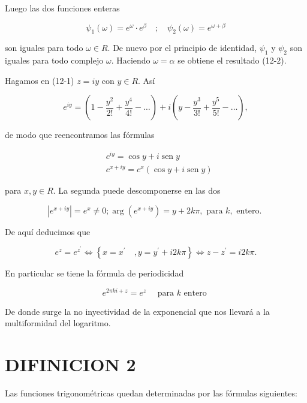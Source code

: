 \documentclass[10pt]{article}
\theoremstyle{plain}
\theoremstyle{definition}
\theoremstyle{remark}
\begin{document}
Luego las dos funciones enteras

$$
\psi_{1}(\omega)=e^{\omega} \cdot e^{\beta} \quad ; \quad \psi_{2}(\omega)=e^{\omega+\beta}
$$

son iguales para todo $\omega \in R$. De nuevo por el principio de identidad, $\psi_{1}$ y $\psi_{2}$ son iguales para todo complejo $\omega$. Haciendo $\omega=\alpha$ se obtiene el resultado (12-2).

Hagamos en (12-1) $z=i y$ con $y \in R$. Así

$$
e^{i y}=\left(1-\frac{y^{2}}{2!}+\frac{y^{4}}{4!}-\ldots\right)+i\left(y-\frac{y^{3}}{3!}+\frac{y^{5}}{5!}-\ldots\right),
$$

de modo que reencontramos las fórmulas


\begin{align*}
& c^{i y}=\cos y+i \operatorname{sen} y  \tag{$12\cdot3$}\\
& c^{x+i y}=c^{x}(\cos y+i \operatorname{sen} y) \tag{$12\cdot4$}
\end{align*}


para $x, y \in R$. La segunda puede descomponerse en las dos


\begin{equation*}
\left|e^{x+i y}\right|=e^{x} \neq 0 ; \arg \left(e^{x+i y}\right)=y+2 k \pi, \text { para } k, \text { entero. } \tag{12-5}
\end{equation*}


De aquí deducimos que


\begin{equation*}
e^{z}=e^{z^{\prime}} \Longleftrightarrow\left\{x=x^{\prime} \quad, y=y^{\prime}+i 2 k \pi\right\} \Longleftrightarrow z-z^{\prime}=i 2 k \pi . \tag{12-6}
\end{equation*}


En particular se tiene la fórmula de periodicidad


\begin{equation*}
e^{2 \pi k i+z}=e^{z} \quad \text { para } k \text { entero } \tag{12-7}
\end{equation*}


De donde surge la no inyectividad de la exponencial que nos llevará a la multiformidad del logaritmo.

\section*{DIFINICION 2}
Las funciones trigonométricas quedan determinadas por las fórmulas siguientes:
\end{document}
